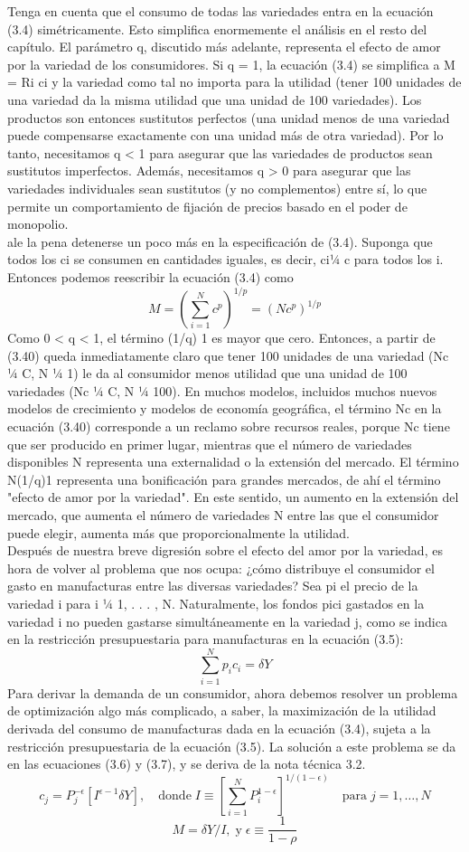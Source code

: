 Tenga en cuenta que el consumo de todas las variedades entra en la ecuación (3.4) simétricamente. Esto simplifica enormemente el análisis en el resto del capítulo. El parámetro q, discutido más adelante, representa el efecto de amor por la variedad de los consumidores. Si q = 1, la ecuación (3.4) se simplifica a M = Ri ci y la variedad como tal no importa para la utilidad (tener 100 unidades de una variedad da la misma utilidad que una unidad de 100 variedades). Los productos son entonces sustitutos perfectos (una unidad menos de una variedad puede compensarse exactamente con una unidad más de otra variedad). Por lo tanto, necesitamos q < 1 para asegurar que las variedades de productos sean sustitutos imperfectos. Además, necesitamos q > 0 para asegurar que las variedades individuales sean sustitutos (y no complementos) entre sí, lo que permite un comportamiento de fijación de precios basado en el poder de monopolio.\\
ale la pena detenerse un poco más en la especificación de (3.4). Suponga que todos los ci se consumen en cantidades iguales, es decir, ci¼ c para todos los i. Entonces podemos reescribir la ecuación (3.4) como
$$M=\left(\sum_{i=1}^N c^p\right)^{1/p}=(Nc^p)^{1/p}$$
Como 0 < q < 1, el término (1/q) 1 es mayor que cero. Entonces, a partir de (3.40) queda inmediatamente claro que tener 100 unidades de una variedad (Nc ¼ C, N ¼ 1) le da al consumidor menos utilidad que una unidad de 100 variedades (Nc ¼ C, N ¼ 100). En muchos modelos, incluidos muchos nuevos modelos de crecimiento y modelos de economía geográfica, el término Nc en la ecuación (3.40) corresponde a un reclamo sobre recursos reales, porque Nc tiene que ser producido en primer lugar, mientras que el número de variedades disponibles N representa una externalidad o la extensión del mercado. El término N(1/q)1 representa una bonificación para grandes mercados, de ahí el término "efecto de amor por la variedad". En este sentido, un aumento en la extensión del mercado, que aumenta el número de variedades N entre las que el consumidor puede elegir, aumenta más que proporcionalmente la utilidad.\\
Después de nuestra breve digresión sobre el efecto del amor por la variedad, es hora de volver al problema que nos ocupa: ¿cómo distribuye el consumidor el gasto en manufacturas entre las diversas variedades? Sea pi el precio de la variedad i para i ¼ 1, . . . , N. Naturalmente, los fondos pici gastados en la variedad i no pueden gastarse simultáneamente en la variedad j, como se indica en la restricción presupuestaria para manufacturas en la ecuación (3.5):\\
$$\sum_{i=1}^N p_ic_i=\delta Y$$
Para derivar la demanda de un consumidor, ahora debemos resolver un problema de optimización algo más complicado, a saber, la maximización de la utilidad derivada del consumo de manufacturas dada en la ecuación (3.4), sujeta a la restricción presupuestaria de la ecuación (3.5). La solución a este problema se da en las ecuaciones (3.6) y (3.7), y se deriva de la nota técnica 3.2.
$$c_j=P_j^{-\epsilon}[I^{\epsilon-1}\delta Y],\quad \mbox{donde}\; I\equiv \left[\sum_{i=1}^N P_i^{1-\epsilon}\right]^{1/(1-\epsilon)}\quad \mbox{para}\; j=1,\ldots,N$$
$$M=\delta Y/I,\; \mbox{y}\; \epsilon \equiv \dfrac{1}{1-\rho}$$

